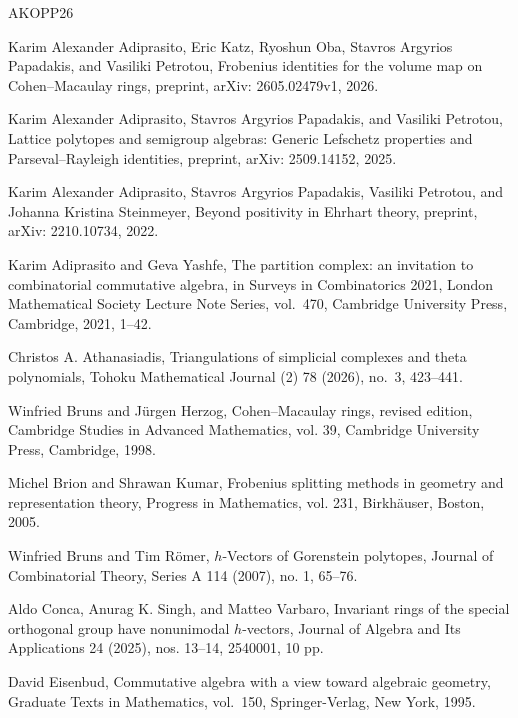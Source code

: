 \documentclass[a4paper,11pt]{amsart}
\theoremstyle{definition}
\begin{document}
\begin{thebibliography}{AKOPP26}
\setlength{\baselineskip}{10.35pt}
\setlength{\itemsep}{0.6pt}

 Karim Alexander Adiprasito, Eric Katz, Ryoshun Oba, Stavros Argyrios Papadakis, and Vasiliki Petrotou, Frobenius identities for the volume map on Cohen--Macaulay rings, preprint, arXiv: 2605.02479v1, 2026.

 Karim Alexander Adiprasito, Stavros Argyrios Papadakis, and Vasiliki Petrotou, Lattice polytopes and semigroup algebras: Generic Lefschetz properties and Parseval--Rayleigh identities, preprint, arXiv: 2509.14152, 2025.

 Karim Alexander Adiprasito, Stavros Argyrios Papadakis, Vasiliki Petrotou, and Johanna Kristina Steinmeyer, Beyond positivity in Ehrhart theory, preprint, arXiv: 2210.10734, 2022.

 Karim Adiprasito and Geva Yashfe, The partition complex: an invitation to combinatorial commutative algebra, in Surveys in Combinatorics 2021, London Mathematical Society Lecture Note Series, vol.~470, Cambridge University Press, Cambridge, 2021, 1--42.

 Christos A. Athanasiadis, Triangulations of simplicial complexes and theta polynomials, Tohoku Mathematical Journal (2) 78 (2026), no.~3, 423--441.

 Winfried Bruns and J\"urgen Herzog, Cohen--Macaulay rings, revised edition, Cambridge Studies in Advanced Mathematics, vol. 39, Cambridge University Press, Cambridge, 1998.

 Michel Brion and Shrawan Kumar, Frobenius splitting methods in geometry and representation theory, Progress in Mathematics, vol. 231, Birkh\"auser, Boston, 2005.

 Winfried Bruns and Tim R\"omer, $h$-Vectors of Gorenstein polytopes, Journal of Combinatorial Theory, Series A 114 (2007), no. 1, 65--76.

 Aldo Conca, Anurag K. Singh, and Matteo Varbaro, Invariant rings of the special orthogonal group have nonunimodal $h$-vectors, Journal of Algebra and Its Applications 24 (2025), nos. 13--14, 2540001, 10 pp.

 David Eisenbud, Commutative algebra with a view toward algebraic geometry, Graduate Texts in Mathematics, vol.~150, Springer-Verlag, New York, 1995.


\end{thebibliography}
\end{document}
